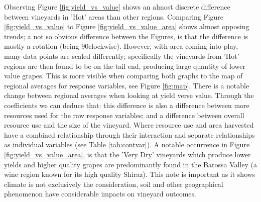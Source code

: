 \documentclass[review,12pt,authoryear]{elsarticle}
\begin{document}
\begin{linenumbers}
\newline
Observing Figure \ref{fig:yield_vs_value} shows an almost discrete difference between vineyards in 'Hot' areas than other regions. Comparing Figure \ref{fig:yield_vs_value} to Figure \ref{fig:yield_vs_value_area} shows almost opposing trends; a not so obvious difference between the Figures, is that the difference is mostly a rotation (being 90\textdegree clockwise). However, with area coming into play, many data points are scaled differently; specifically the vineyards from 'Hot' regions are then found to be on the tail end, producing large quantity of lower value grapes. This is more visible when comparing both graphs to the map of regional averages for response variables, see Figure \ref{fig:map}. There is a notable change between regional averages when looking at yield verse value. Through the coefficients we can deduce that: this difference is also a difference between more resources used for the raw response variables; and a difference between overall resource use and the size of the vineyard. Where resource use and area harvested have a combined relationship through their interaction and separate relationships as individual variables (see Table \ref{tab:contvar}). A notable occurrence in Figure \ref{fig:yield_vs_value_area}, is that the 'Very Dry' vineyards which produce lower yields and higher quality grapes are predominantly found in the Barossa Valley (a wine region known for its high quality Shiraz). This note is important as it shows climate is not exclusively the consideration, soil and other geographical phenomenon have considerable impacts on vineyard outcomes.

%
%
%
%

\end{linenumbers}
\end{document}

